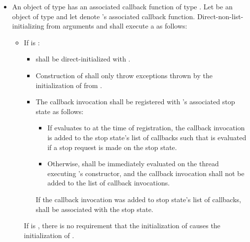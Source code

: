 \begin{itemize}
\item
An object of type  has
an associated callback function of type .
Let  be an object of type  and
let  denote 's associated callback function.
Direct-non-list-initializing  from
arguments  and 
shall execute a  as follows:
\begin{itemize}
\item
If  is :
\begin{itemize}
\item
{} shall be direct-initialized with .
\item
Construction of  shall only throw exceptions
thrown by the initialization of  from .
\item
The callback invocation 
shall be registered with 's associated stop state as follows:
\begin{itemize}
\item
If  evaluates to 
at the time of registration,
the callback invocation is added to the stop state's list of callbacks
such that  is evaluated
if a stop request is made on the stop state.
\item
Otherwise, 
shall be immediately evaluated
on the thread executing 's constructor, and
the callback invocation shall not be added to the list of callback invocations.
\end{itemize}
If the callback invocation was added to stop state's list of callbacks,
 shall be associated with the stop state.
\end{itemize}
\begin{note}
If  is ,
there is no requirement
that the initialization of 
causes the initialization of .
\end{note}
\end{itemize}


\end{itemize}
